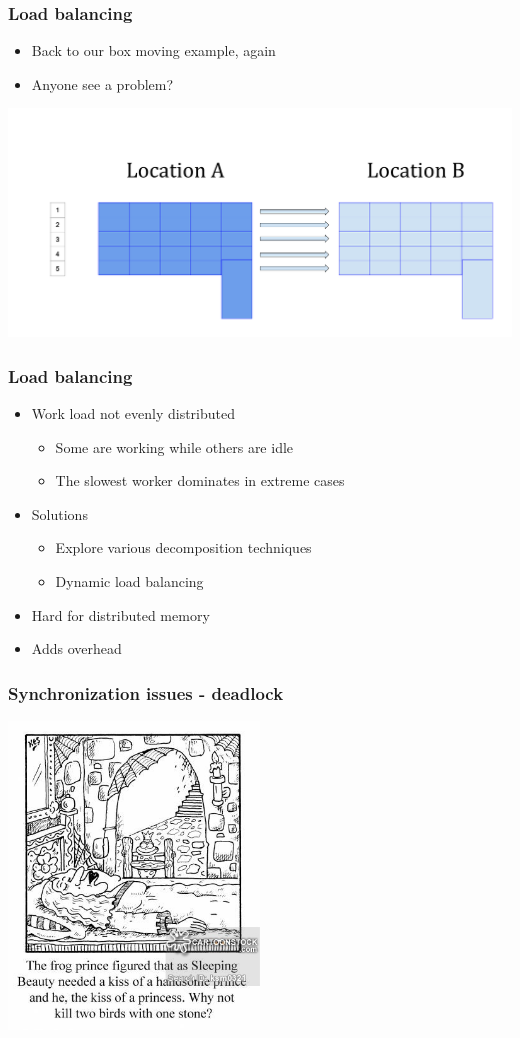 \documentclass[10pt,t]{beamer}
\begin{document}
\begin{frame}
  \frametitle{Load balancing}
  \begin{itemize}
  \item Back to our box moving example, again
  \item Anyone see a problem?
  \end{itemize}
  \includegraphics[width=\textwidth]{./Load-Balance}
\end{frame}

\begin{frame}
  \frametitle{Load balancing}
  \begin{itemize}
  \item Work load not evenly distributed
    \begin{itemize}
    \item Some are working while others are idle
    \item The slowest worker dominates in extreme cases
    \end{itemize}
  \item Solutions
    \begin{itemize}
    \item Explore various decomposition techniques
    \item Dynamic load balancing
    \end{itemize}
  \item Hard for distributed memory
  \item Adds overhead
  \end{itemize}
\end{frame}

\begin{frame}
  \frametitle{Synchronization issues - deadlock}
  \begin{center}
    \includegraphics[width=0.5\textwidth]{./SBFP}
  \end{center}
\end{frame}
\end{document}
